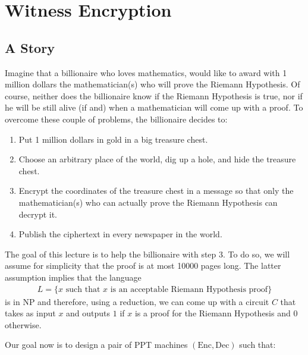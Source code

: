 
\chapter{Witness Encryption}


\section{A Story}\label{story}

Imagine that a billionaire who loves mathematics, would like to award with 1 million dollars the mathematician(s) who will prove the Riemann Hypothesis. Of course, neither does the billionaire know if the Riemann Hypothesis is true, nor if he will be still alive (if and) when a mathematician will come up with a proof. To overcome these couple of problems, the billionaire decides to:

\begin{enumerate}

\item Put 1 million dollars in gold in a big treasure chest.

\item Choose an arbitrary place of the world, dig up a hole, and hide the treasure chest.

\item Encrypt the coordinates of the treasure chest in a message so that only the mathematician(s) who can actually prove the Riemann Hypothesis can decrypt it.

\item Publish the ciphertext in every newspaper in the world.

\end{enumerate}

The goal of this lecture is to help the billionaire with step 3. To do so, we will assume for simplicity  that the proof is at most 10000 pages long. The latter assumption implies that the language
\begin{align*}
L = \{ x \text{ such that } x \text{ is an acceptable Riemann Hypothesis proof} \}
\end{align*}
 is in NP and therefore, using a reduction, we can come up with a circuit $C$ that takes as input $x$ and outputs $1$ if $x$ is a proof for the Riemann Hypothesis and $0$ otherwise.

\smallskip
Our goal now is to  design a pair of PPT machines $(\mathrm{Enc},\mathrm{Dec})$ such that:

